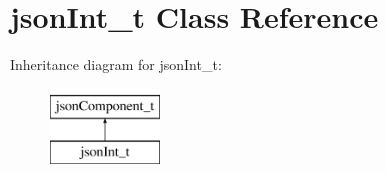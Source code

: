 \hypertarget{classjsonInt__t}{\section{json\-Int\-\_\-t \-Class \-Reference}
\label{classjsonInt__t}
}
\-Inheritance diagram for json\-Int\-\_\-t\-:\begin{figure}[H]
\begin{center}
\leavevmode
\includegraphics[height=2.000000cm]{classjsonInt__t}
\end{center}
\end{figure}
